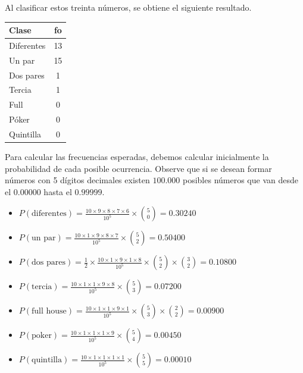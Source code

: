 Al clasificar estos treinta números, se obtiene el siguiente resultado.

\begin{center}
 \begin{tabular}{|lc|}
        \hline
        \textbf{Clase} & \textbf{fo} \\ \hline\hline
        Diferentes & 13 \\ 
        Un par & 15 \\ 
        Dos pares & 1 \\ 
        Tercia & 1 \\ 
        Full & 0 \\ 
        Póker & 0 \\ 
        Quintilla & 0 \\ \hline
    \end{tabular}
\end{center}


Para calcular las frecuencias esperadas, debemos calcular inicialmente la probabilidad de cada posible ocurrencia. Observe que si se desean formar números con 5 dígitos decimales existen $100.000$ posibles números que van desde el $0.00000$ hasta el $0.99999$.
{
\begin{itemize}

\item $P(\text{diferentes}) = \frac{10\times 9 \times 8 \times 7\times 6}{10^5}\times \binom{5}{0} = 0.30240$

\item $P(\text{un par}) = \frac{10\times 1 \times 9 \times 8\times 7}{10^5} \times \binom{5}{2}= 0.50400$

\item $P(\text{dos pares}) = \frac{1}{2}\times \frac{10\times 1 \times 9 \times 1\times 8}{10^5} \times \binom{5}{2}\times \binom{3}{2}= 0.10800$


\item $P(\text{tercia}) = \frac{10\times 1 \times 1 \times 9\times 8}{10^5} \times \binom{5}{3}= 0.07200$

\item $P(\text{full house}) = \frac{10\times 1 \times 1 \times 9\times 1}{10^5} \times \binom{5}{3}\times \binom{2}{2}= 0.00900$

\item $P(\text{poker}) =  \frac{10\times 1 \times 1 \times 1\times 9}{10^5} \times \binom{5}{4} = 0.00450$

\item $P(\text{quintilla}) =  \frac{10\times 1 \times 1 \times 1\times 1}{10^5} \times \binom{5}{5} = 0.00010$


\end{itemize}
}


